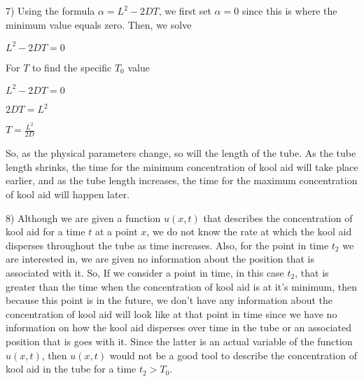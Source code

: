 \documentclass[executivepaper]{article}
\begin{document}
\begin{flushleft}

7) Using the formula $\alpha=L^2-2DT$, we first set $\alpha=0$ since this is where the minimum value equals zero. Then, we solve

\begin{center}

$L^2-2DT=0$

\end{center}

For $T$ to find the specific $T_{0}$ value

\begin{center}

$L^2-2DT=0$

\vspace{3mm}

$2DT=L^2$

\vspace{3mm}

$T=\frac{L^2}{2D}$

\end{center}

So, as the physical parameters change, so will the length of the tube. As the tube length shrinks, the time for the minimum concentration of kool aid will take place earlier, and as the tube length increases, the time for the maximum concentration of kool aid will happen later.

\end{flushleft}

\begin{flushleft}

8) Although we are given a function $u(x,t)$ that describes the concentration of kool aid for a time $t$ at a point $x$, we do not know the rate at which the kool aid disperses throughout the tube as time increases. Also, for the point in time $t_{2}$ we are interested in, we are given no information about the position that is associated with it. So, If we consider a point in time, in this case $t_{2}$, that is greater than the time when the concentration of kool aid is at it's minimum, then because this point is in the future, we don't have any information about the concentration of kool aid will look like at that point in time since we have no information on how the kool aid disperses over time in the tube or an associated position that is goes with it. Since the latter is an actual variable of the function $u(x,t)$, then $u(x,t)$ would not be a good tool to describe the concentration of kool aid in the tube for a time $t_{2} > T_{0}$.

\end{flushleft}
\end{document}
